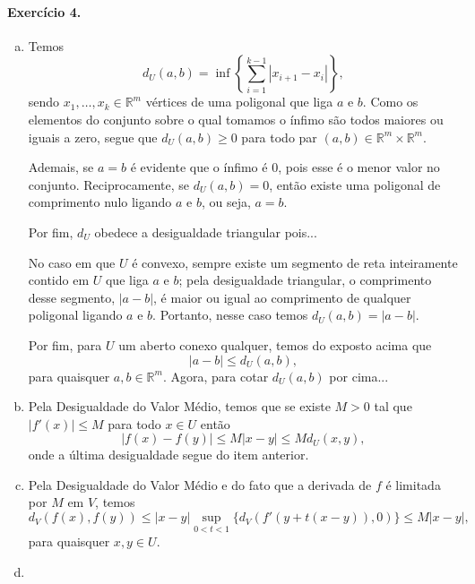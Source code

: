 \documentclass[12pt,a4paper]{article}
\newcommand{\R}{\mathbb{R}}
\begin{document}
\paragraph{Exercício 4.}
    \begin{enumerate}[a)]
        \item Temos
        \begin{equation*}
            d_U(a,b) = \inf\left\{ \sum_{i=1}^{k-1} |x_{i+1} - x_i| \right\},
        \end{equation*}
        sendo $x_1, \dots, x_k\in\R^m$ vértices de uma poligonal que liga
        $a$ e $b$. Como os elementos do conjunto sobre o qual tomamos o ínfimo
        são todos maiores ou iguais a zero, segue que $d_U(a,b) \geq 0$ para
        todo par $(a,b)\in\R^m\times\R^m$.
        
        Ademais, se $a=b$ é evidente que o ínfimo é $0$, pois esse é o menor
        valor no conjunto. Reciprocamente, se
        $d_U(a,b) = 0$, então existe uma poligonal de comprimento nulo ligando
        $a$ e $b$, ou seja, $a=b$.
        
        Por fim, $d_U$ obedece a desigualdade triangular pois...
        
        No caso em que $U$ é convexo, sempre existe um segmento de reta inteiramente
        contido em $U$ que liga $a$ e $b$; pela desigualdade triangular,
        o comprimento desse segmento, $|a-b|$, é maior ou igual ao comprimento de
        qualquer poligonal ligando $a$ e $b$. Portanto, nesse caso temos
        $d_U(a,b) = |a-b|$.
        
        Por fim, para $U$ um aberto conexo qualquer, temos do exposto acima que
        \begin{equation*}
            |a-b| \leq d_U(a,b),
        \end{equation*}
        para quaisquer $a,b\in\R^m$. Agora, para cotar $d_U(a,b)$ por cima...
        
        \item Pela Desigualdade do Valor Médio, temos que se existe $M > 0$
        tal que $|f'(x)| \leq M$
        para todo $x\in U$ então
        \begin{equation*}
            |f(x) - f(y)| \leq M|x-y| \leq M d_U(x,y),
        \end{equation*}
        onde a última desigualdade segue do item anterior.
        
        \item Pela Desigualdade do Valor Médio e do fato que a derivada de $f$
        é limitada por $M$ em $V$, temos
        \begin{equation*}
            d_V(f(x), f(y)) \leq |x-y| \sup_{0<t<1} \{ d_V(f'(y + t(x-y)), 0) \}
                            \leq M |x-y|,
        \end{equation*}
        para quaisquer $x,y\in U$.
        
        \item
    \end{enumerate}
\end{document}
